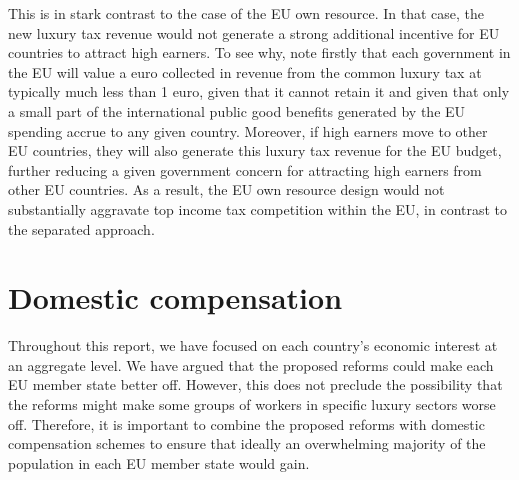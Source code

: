 \documentclass[../../main]{subfiles}
\begin{document}
This is in stark contrast to the case of the EU own resource. In that case, the new luxury tax revenue would not generate a strong additional incentive for EU countries to attract high earners. To see why, note firstly that each government in the EU will value a euro collected in revenue from the common luxury tax at typically much less than 1 euro, given that it cannot retain it and given that only a small part of the international public good benefits generated by the EU spending accrue to any given country. Moreover, if high earners move to other EU countries, they will also generate this luxury tax revenue for the EU budget, further reducing a given government concern for attracting high earners from other EU countries. As a result, the EU own resource design would not substantially aggravate top income tax competition within the EU, in contrast to the separated approach. %

\section{Domestic compensation} %


Throughout this report, we have focused on each country's economic interest at an aggregate level. We have argued that the proposed reforms could make each EU member state better off. However, this does not preclude the possibility that the reforms might make some groups of workers in specific luxury sectors worse off. Therefore, it is important to combine the proposed reforms with domestic compensation schemes to ensure that ideally an overwhelming majority of the population in each EU member state would gain. 
\end{document}
